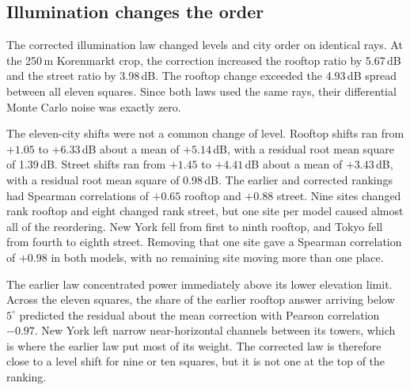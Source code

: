 \documentclass[journal]{IEEEtran}
\begin{document}
\subsection{Illumination changes the order}

The corrected illumination law changed levels and city order on identical rays.
At the 250\,m Korenmarkt crop, the correction increased the rooftop ratio by
5.67\,dB and the street ratio by 3.98\,dB. The rooftop change exceeded the
4.93\,dB spread between all eleven squares. Since both laws used the same rays,
their differential Monte Carlo noise was exactly zero.

The eleven-city shifts were not a common change of level. Rooftop shifts ran from
$+1.05$ to $+6.33$\,dB about a mean of $+5.14$\,dB, with a residual root mean
square of 1.39\,dB. Street shifts ran from $+1.45$ to $+4.41$\,dB about a mean
of $+3.43$\,dB, with a residual root mean square of 0.98\,dB. The earlier and
corrected rankings had Spearman correlations of $+0.65$ rooftop and $+0.88$
street. Nine sites changed rank rooftop and eight changed rank street, but one
site per model caused almost all of the reordering. New York fell from first to
ninth rooftop, and Tokyo fell from fourth to eighth street. Removing that one
site gave a Spearman correlation of $+0.98$ in both models, with no remaining
site moving more than one place.

The earlier law concentrated power immediately above its lower elevation limit.
Across the eleven squares, the share of the earlier rooftop answer arriving below
$5^\circ$ predicted the residual about the mean correction with Pearson
correlation $-0.97$. New York left narrow near-horizontal channels between its
towers, which is where the earlier law put most of its weight. The corrected law
is therefore close to a
level shift for nine or ten squares, but it is not one at the top of the ranking.
\end{document}
